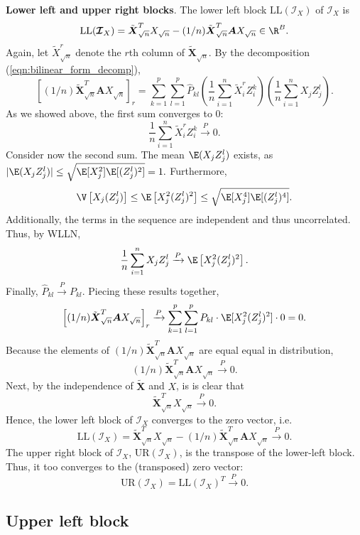 \documentclass[12pt]{article}
\newcommand{\bs}[1]{\boldsymbol{#1}}
\newcommand{\infomat}{\bs{\mathcal{I}}}
\begin{document}
\textbf{Lower left and upper right blocks}. The lower left block $\textrm{LL}(\infomat_X)$ of $\infomat_X$ is $$ \textrm{LL}(\infomat_X) = \tilde{\bs{X}}_{\sqrt{n}}^T X_{\sqrt{n}} -  (1/n) \tilde{\bs{X}}^T_{\sqrt{n}} \bs{A} X_{\sqrt{n}} \in \R^B.$$ Again, let $\tilde{X}^r_{\sqrt{n}}$ denote the $r$th column of $\tilde{\bs{X}}_{\sqrt{n}}.$ By the decomposition (\ref{eqn:bilinear_form_decomp}),
$$
\left[(1/n) \tilde{\bs{X}}^T_{\sqrt{n}} \bs{A} X_{\sqrt{n}}\right]_r  = \sum_{k=1}^p \sum_{l=1}^p \hat{P}_{kl} \left( \frac{1}{n} \sum_{i=1}^n \tilde{X}^r_i Z^k_i \right) \left(\frac{1}{n}\sum_{i=1}^n X_j Z^l_j \right).
$$
As we showed above, the first sum converges to $0$:
$$ \frac{1}{n} \sum_{i=1}^n \tilde{X}^r_i Z_i^k \xrightarrow{P} 0.$$
Consider now the second sum. The mean $\E(X_j Z^l_j)$ exists, as $|\E(X_j Z^l_j)| \leq \sqrt{\E[X_j^2] \E[(Z^l_j)^2]} = 1.$ Furthermore, $$\V\left[X_j (Z_j^l)\right] \leq \E\left[X_j^2 (Z_j^l)^2 \right] \leq \sqrt{\E[X_j^4] \E[(Z_j^l)^4]}.$$ Additionally, the terms in the sequence are independent and thus uncorrelated. Thus, by WLLN,
$$ \frac{1}{n} \sum_{i=1}^n X_j Z^l_j \xrightarrow{P} \E\left[ X^2_j (Z_j^l)^2 \right].$$
Finally, $\hat{P}_{kl} \xrightarrow{P} P_{kl}.$ Piecing these results together,
$$
\left[(1/n) \tilde{\bs{X}}^T_{\sqrt{n}} \bs{A} X_{\sqrt{n}}\right]_r  \xrightarrow{P} \sum_{k=1}^p \sum_{l=1}^p P_{kl} \cdot \E[X^2_j (Z^l_j)^2] \cdot 0 = 0.
$$
Because the elements of $(1/n) \tilde{\bs{X}}^T_{\sqrt{n}} \bs{A} X_{\sqrt{n}}$ are equal equal in distribution, $$(1/n) \tilde{\bs{X}}^T_{\sqrt{n}} \bs{A} X_{\sqrt{n}} \xrightarrow{P} 0.$$ Next, by the independence of $\tilde{\bs{X}}$ and $X$, is is clear that $$\tilde{\bs{X}}^T_{\sqrt{n}} X_{\sqrt{n}} \xrightarrow{P} 0.$$ Hence, the lower left block of $\infomat_X$ converges to the zero vector, i.e.
$$\textrm{LL}(\infomat_X) = \tilde{\bs{X}}^T_{\sqrt{n}} X_{\sqrt{n}} - (1/n) \tilde{\bs{X}}^T_{\sqrt{n}} \bs{A} X_{\sqrt{n}} \xrightarrow{P} 0.$$ The upper right block of $\infomat_X$, $\textrm{UR}(\infomat_X)$, is the transpose of the lower-left block. Thus, it too converges to the (transposed) zero vector: 
$$\textrm{UR}(\infomat_X) = \textrm{LL}(\infomat_X)^T \xrightarrow{P} 0.$$

\subsection*{Upper left block}
\end{document}
